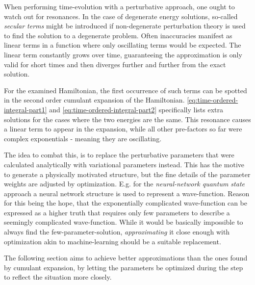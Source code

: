 When performing time-evolution with a perturbative approach, one ought to watch out for resonances.
In the case of degenerate energy solutions, so-called \emph{secular terms} \cite{secularTermsPerturbation} might be introduced if non-degenerate perturbation theory is used to find the solution to a degenerate problem. 
Often inaccuracies manifest as linear terms in a function where only oscillating terms would be expected.
The linear term constantly grows over time, guaranteeing the approximation is only valid for short times and then diverges further and further from the exact solution.

For the examined Hamiltonian, the first occurrence of such terms can be spotted in the second order cumulant expansion of the Hamiltonian.
\autoref{eq:time-ordered-integral-part1} and \autoref{eq:time-ordered-integral-part2} specifically lists extra solutions for the cases where the two energies are the same.
This resonance causes a linear term to appear in the expansion, while all other pre-factors so far were complex exponentials - meaning they are oscillating.

The idea to combat this, is to replace the perturbative parameters that were calculated analytically with variational parameters instead.
This has the motive to generate a physically motivated structure, but the fine details of the parameter weights are adjusted by optimization.
E.g. for the \emph{neural-network quantum state} \cite{neuralNetworkQuantumStates} approach a neural network structure is used to represent a wave-function.
Reason for this being the hope, that the exponentially complicated wave-function can be expressed as a \glqq higher truth\grqq{} that requires only few parameters to describe a seemingly complicated wave-function.
While it would be basically impossible to always find the few-parameter-solution, \emph{approximating} it close enough with optimization akin to machine-learning should be a suitable replacement.

The following section aims to achieve better approximations than the ones found by cumulant expansion, by letting the parameters be optimized during the step to reflect the situation more closely.